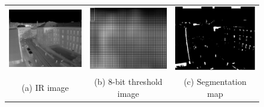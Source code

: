 \documentclass[runningheads]{llncs}
\begin{document}
\begin{figure}
  \centering
  \begin{tabular}{ccc}
    \includegraphics[width=4cm]{img/bg_sub/CLA_Infrared_Image_screenshot_03-08-2015.png} &
    \includegraphics[width=4cm]{img/bg_sub/CLA_Threshold_values(high)_screenshot_03-08-2015.png} &
    \includegraphics[width=4cm]{img/bg_sub/CLA_Segmentation_Map_screenshot_03-08-2015.png} \\
    \small (a) IR image & 
    \small (b) 8-bit threshold image &
    \small (c) Segmentation map
  \end{tabular}

  \vspace{\floatsep}


\end{figure}
\end{document}
